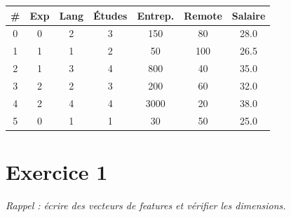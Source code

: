 %






\setlength{\parskip}{2pt}
\setlength{\abovedisplayskip}{5pt}
\setlength{\belowdisplayskip}{5pt}

\begin{tcolorbox}[
    enhanced, colback=ipssiCyan!5, colframe=ipssiCyan!50,
    boxrule=0.8pt, arc=4pt,
    title={\sffamily\bfseries Rappel --- Dataset fil rouge},
    coltitle=white, colbacktitle=ipssiCyan!70,
]
\small
\begin{center}
\renewcommand{\arraystretch}{1.1}
\begin{tabular}{c|ccccc|c}
    \toprule
    \textbf{\#} & \textbf{Exp} & \textbf{Lang} & \textbf{\'{E}tudes} & \textbf{Entrep.} & \textbf{Remote} & \textbf{Salaire} \\
    \midrule
    0 & 0 & 2 & 3 & 150  & 80  & 28.0 \\
    1 & 1 & 1 & 2 & 50   & 100 & 26.5 \\
    2 & 1 & 3 & 4 & 800  & 40  & 35.0 \\
    3 & 2 & 2 & 3 & 200  & 60  & 32.0 \\
    4 & 2 & 4 & 4 & 3000 & 20  & 38.0 \\
    5 & 0 & 1 & 1 & 30   & 50  & 25.0 \\
    \bottomrule
\end{tabular}
\end{center}
\end{tcolorbox}

\section*{Exercice 1 \hfill \exofondamental}
\textit{Rappel : \'{e}crire des vecteurs de features et v\'{e}rifier les dimensions.}

